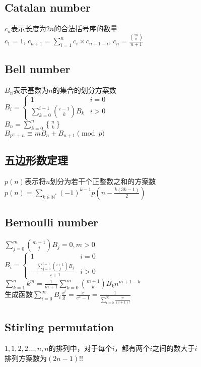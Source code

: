     \subsection*{Catalan number}
        $ c_n $表示长度为$ 2n $的合法括号序的数量
        \\$ c_1 = 1 $, $ c_{n+1} = \sum\limits_{i=1}^{n} c_i \times c_{n + 1 - i} $, $ c_n = \frac{\binom{2n}{n}}{n + 1} $
    \subsection*{Bell number}
        $ B_n $表示基数为$ n $的集合的划分方案数
        \\$ B_i = \begin{cases}
            1 & i = 0\\
            \sum\limits_{k = 0}^{i - 1} \binom{i - 1}{k} B_k & i > 0
        \end{cases} $
        \\$ B_n = \sum\limits_{k = 0}^{n} {n \brace k} $
        \\$ B_{p^m + n} \equiv m B_n + B_{n + 1} \pmod p $
    \subsection*{五边形数定理}
        $ p(n) $表示将$ n $划分为若干个正整数之和的方案数
        \\$ p(n) = \sum\limits_{k \in \mathbb{N}^\ast} (-1)^{k - 1} p(n - \frac{k(3k - 1)}{2}) $
    \subsection*{Bernoulli number}
        \noindent$ \sum\limits_{j = 0}^{m} \binom{m + 1}{j} B_j = 0, m > 0 $
        \\$ B_i = \begin{cases}
            1 & i = 0\\
            -\frac{\sum\limits_{j = 0}^{i - 1} \binom{i + 1}{j} B_j}{i + 1} & i > 0
        \end{cases} $
        \\$ \sum\limits_{k = 1}^{n} k ^ m = \frac{1}{m + 1} \sum\limits_{k = 0}^{m} \binom{m + 1}{k} B_k n ^ {m + 1 - k} $
        \\生成函数$ \sum\limits_{i = 0}^{\infty} B_i \frac{x^i}{i!} = \frac{x}{e^x - 1} = \frac{1}{\sum\limits_{i = 0}^{\infty} \frac{x^i}{(i + 1)!}} $
    \subsection*{Stirling permutation}
        $ 1, 1, 2, 2 \dots , n, n $的排列中，对于每个$ i $，都有两个$ i $之间的数大于$ i $
        \\排列方案数为$ (2n - 1)!! $
